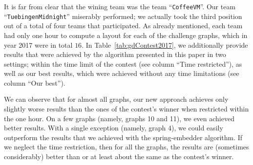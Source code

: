 \documentclass{comjnl}
\begin{document}
It is far from clear that the wining team was the team  ``\texttt{CoffeeVM}''. Our team ``\texttt{TuebingenMidnight}''  miserably performed; we actually took the third position out of a total of four teams that participated. As already mentioned, each team had only one hour to compute a layout for each of the challenge graphs, which in year 2017 were in total $16$. In Table~\ref{tab:gdContest2017}, we additionally provide results that were achieved by the algorithm presented in this paper in two settings; within the time limit of the contest (see column ``Time restricted''), as well as our best results, which were achieved without any time limitations (see column ``Our best'').

We can observe that for almost all graphs, our new approach achieves only slightly worse results than the ones of the contest's winner when restricted within the one hour. On a few graphs (namely, graphs 10 and 11), we even achieved better results. With a single exception (namely, graph 4), we could easily outperform the results that we achieved with the spring-embedder algorithm. If we neglect the time restriction, then for all the graphs, the results  are (sometimes considerably) better than or at least about the same as the contest's winner. 
\end{document}
